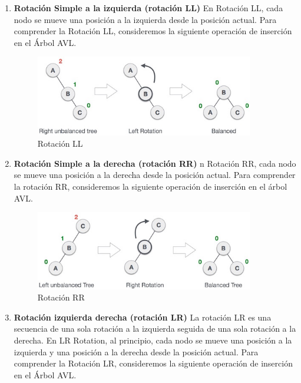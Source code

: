 \documentclass{article}
\begin{document}
\begin{enumerate}

		\item \textbf{Rotación Simple a la izquierda (rotación LL)}
		En Rotación LL, cada nodo se mueve una posición a la izquierda desde la posición actual. Para comprender la Rotación LL, consideremos la siguiente operación de inserción en el Árbol AVL.
		
		\begin{figure}[H]
\centering
\includegraphics[width=0.9\textwidth]{img/avl_left_rotation.jpg}
\caption{Rotación LL}
\end{figure}
		
		\item \textbf{Rotación Simple a la derecha (rotación RR)}
		n Rotación RR, cada nodo se mueve una posición a la derecha desde la posición actual. Para comprender la rotación RR, consideremos la siguiente operación de inserción en el árbol AVL.
		
		\begin{figure}[H]
\centering
\includegraphics[width=0.9\textwidth]{img/avl_right_rotation.jpg}
\caption{Rotación RR}
\end{figure}
		
		\item \textbf{Rotación izquierda derecha (rotación LR)}
		La rotación LR es una secuencia de una sola rotación a la izquierda seguida de una sola rotación a la derecha. En LR Rotation, al principio, cada nodo se mueve una posición a la izquierda y una posición a la derecha desde la posición actual. Para comprender la Rotación LR, consideremos la siguiente operación de inserción en el Árbol AVL.
		

\end{enumerate}
\end{document}
